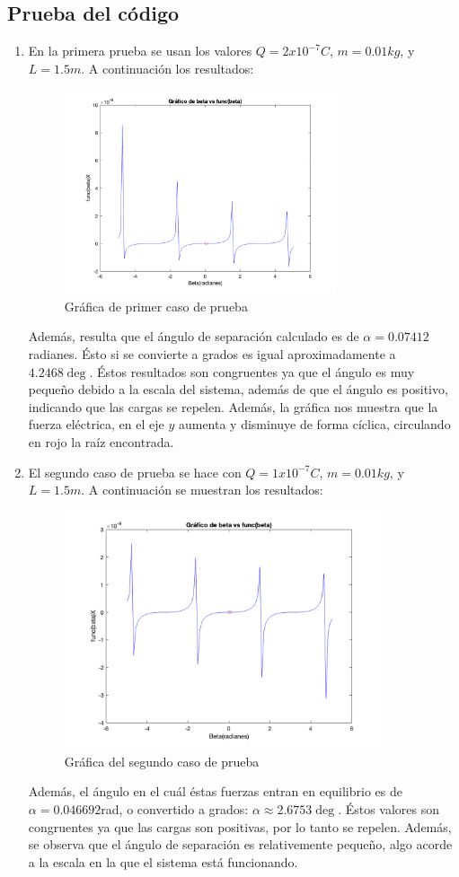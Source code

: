 \documentclass[12pt, letterpaper]{report}
\begin{document}
\subsection*{Prueba del código}
\begin{enumerate}
\item En la primera prueba se usan los valores $Q = 2x10^{-7} C$, $m = 0.01kg$, y $L = 1.5m$. A continuación los resultados: 
\begin{figure}[H]
    \centering
    \includegraphics[height = 6cm]{2024-04-17_Grafica1.png}
    \caption{Gráfica de primer caso de prueba}
\end{figure}
Además, resulta que el ángulo de separación calculado es de $\alpha = 0.07412$ radianes. Ésto si se convierte a grados es igual aproximadamente a $4.2468\deg$. Éstos resultados 
son congruentes ya que el ángulo es muy pequeño debido a la escala del sistema, además de que el ángulo es positivo, indicando que las cargas se repelen. Además, la gráfica nos muestra que 
la fuerza eléctrica, en el eje $y$ aumenta y disminuye de forma cíclica, circulando en rojo la raíz encontrada. 
\item El segundo caso de prueba se hace con $Q = 1x10^{-7}C$, $m = 0.01kg$, y $L = 1.5m$. A continuación se muestran los resultados: 
\begin{figure}[H]
    \centering
    \includegraphics[height = 7cm]{2024-04-17_Grafica2.png} 
    \caption{Gráfica del segundo caso de prueba}
\end{figure}
Además, el ángulo en el cuál éstas fuerzas entran en equilibrio es de $\alpha = 0.046692 $rad, o convertido a grados: $\alpha \approx 2.6753 \deg$. Éstos valores son congruentes ya que 
las cargas son positivas, por lo tanto se repelen. Además, se observa que el ángulo de separación es relativemente pequeño, algo acorde a la escala en la que el sistema está funcionando. 
\end{enumerate}
\end{document}
